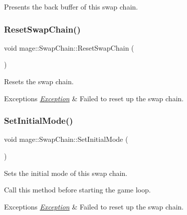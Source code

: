 Presents the back buffer of this swap chain. \hypertarget{classmage_1_1_swap_chain_a30b25245e86823e1b08a39887de8d918}{}\label{classmage_1_1_swap_chain_a30b25245e86823e1b08a39887de8d918} 
\subsubsection{\texorpdfstring{Reset\+Swap\+Chain()}{ResetSwapChain()}}
{\footnotesize\ttfamily void mage\+::\+Swap\+Chain\+::\+Reset\+Swap\+Chain (\begin{DoxyParamCaption}{ }\end{DoxyParamCaption})\hspace{0.3cm}{\ttfamily [private]}}

Resets the swap chain.


\begin{DoxyExceptions}{Exceptions}
{\em \hyperlink{classmage_1_1_exception}{Exception}} & Failed to reset up the swap chain. \\
\hline
\end{DoxyExceptions}
\hypertarget{classmage_1_1_swap_chain_a662009705a6e23064351fd0d9b77ef0e}{}\label{classmage_1_1_swap_chain_a662009705a6e23064351fd0d9b77ef0e} 
\subsubsection{\texorpdfstring{Set\+Initial\+Mode()}{SetInitialMode()}}
{\footnotesize\ttfamily void mage\+::\+Swap\+Chain\+::\+Set\+Initial\+Mode (\begin{DoxyParamCaption}{ }\end{DoxyParamCaption})}

Sets the initial mode of this swap chain.

Call this method before starting the game loop.


\begin{DoxyExceptions}{Exceptions}
{\em \hyperlink{classmage_1_1_exception}{Exception}} & Failed to reset up the swap chain. \\
\hline
\end{DoxyExceptions}
\hypertarget{classmage_1_1_swap_chain_ae2689c07632f1fdc8367c9eefd62851b}{}\label{classmage_1_1_swap_chain_ae2689c07632f1fdc8367c9eefd62851b} 
